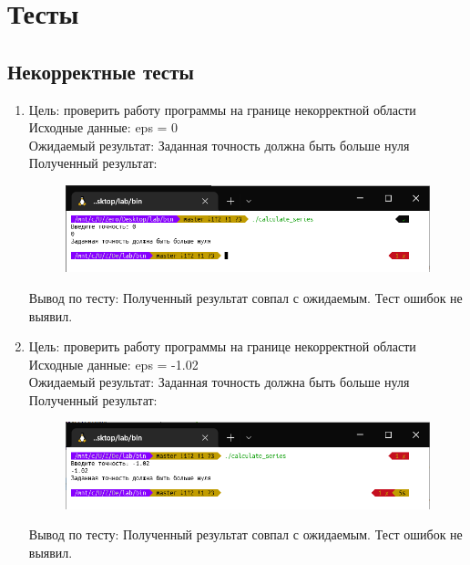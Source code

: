 \documentclass[a4paper]{article}
\begin{document}
	\section{Тесты}
	\subsection{Некорректные тесты}
	
	\begin{enumerate}[label=\textbf{Тест \arabic*}]
		\item Цель: проверить работу программы на границе некорректной области \\
		Исходные данные: eps = 0 \\
		Ожидаемый результат: Заданная точность должна быть больше нуля \\
		Полученный результат:
		
		\begin{figure}[h]
			\includegraphics[width=\textwidth]{tests/test0.png}
		\end{figure}
	
		Вывод по тесту: Полученный результат совпал с ожидаемым. Тест ошибок не выявил.
		\vspace{5mm}
		
		\item Цель: проверить работу программы на границе некорректной области \\
		Исходные данные: eps = -1.02 \\
		Ожидаемый результат: Заданная точность должна быть больше нуля \\
		Полученный результат:
		
		\begin{figure}[h]
			\includegraphics[width=\textwidth]{tests/test-1.02.png}
		\end{figure}
	
		Вывод по тесту: Полученный результат совпал с ожидаемым. Тест ошибок не выявил.
	\end{enumerate}
	
\end{document}
